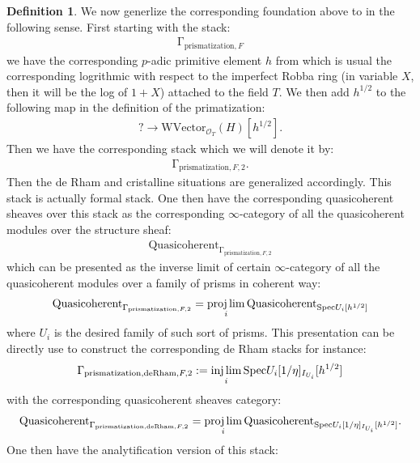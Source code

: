 \documentclass[12pt]{article}
\theoremstyle{definition}
\newtheorem{definition}{Definition}
\begin{document}
\begin{definition}
We now generlize the corresponding foundation above to \cite{BSB} in the following sense. First starting with the stack:
\begin{align}
\mathrm{\Gamma}_{\mathrm{prismatization},F}
\end{align}
we have the corresponding $p$-adic primitive element $h$ from \cite{BSB} which is usual the corresponding logrithmic with respect to the imperfect Robba ring (in variable $X$, then it will be the log of $1+X$) attached to the field $T$. We then add $h^{1/2}$ to the following map in the definition of the primatization:
\begin{align}
?\rightarrow \mathrm{WVector}_{\mathcal{O}_T}(H)[h^{1/2}].
\end{align}
Then we have the corresponding stack which we will denote it by:
\begin{align}
\mathrm{\Gamma}_{\mathrm{prismatization},F,2}.
\end{align}
Then the de Rham and cristalline situations are generalized accordingly. This stack is actually formal stack. One then have the corresponding quasicoherent sheaves over this stack as the corresponding $\infty$-category of all the quasicoherent modules over the structure sheaf:
\begin{align}
\mathrm{Quasicoherent}_{\mathrm{\Gamma}_{\mathrm{prismatization},F,2}}
\end{align}
which can be presented as the inverse limit of certain $\infty$-category of all the quasicoherent modules over a family of prisms in coherent way:
\begin{align}
\mathrm{Quasicoherent}_{\mathrm{\Gamma}_{\mathrm{prismatization},F,2}}=\projlim_i \mathrm{Quasicoherent}_{\mathrm{Spec}U_i[h^{1/2}]}
\end{align}
where $U_i$ is the desired family of such sort of prisms. This presentation can be directly use to construct the corresponding de Rham stacks for instance:
\begin{align}
\mathrm{\Gamma}_{\mathrm{prismatization},\mathrm{deRham},F,2}:=\injlim_i \mathrm{Spec}U_i[1/\eta]_{I_{U_i}}[h^{1/2}]
\end{align}
with the corresponding quasicoherent sheaves category:
\begin{align}
\mathrm{Quasicoherent}_{\mathrm{\Gamma}_{\mathrm{prismatization},\mathrm{deRham},F,2}}=\projlim_i \mathrm{Quasicoherent}_{\mathrm{Spec}U_i[1/\eta]_{I_{U_i}}[h^{1/2}]}.
\end{align}
One then have the analytification version of this stack:

\end{definition}
\end{document}
